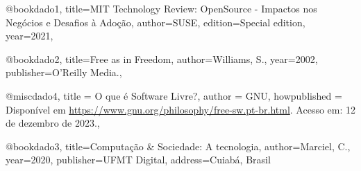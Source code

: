 @book{dado1,
  title={MIT Technology Review: OpenSource - Impactos nos Negócios e Desafios à Adoção},
  author={SUSE},
  edition={Special edition},
  year={2021},
}

@book{dado2,
  title={Free as in Freedom},
  author={Williams, S.},
  year={2002},
  publisher={O'Reilly Media.},
}


@misc{dado4,
  title = {O que é Software Livre?},
  author = {GNU},
  howpublished = {Disponível em \url{https://www.gnu.org/philosophy/free-sw.pt-br.html}. Acesso em: 12 de dezembro de 2023.},
}

@book{dado3,
  title={Computação & Sociedade: A tecnologia},
  author={Marciel, C.},
  year={2020},
  publisher={UFMT Digital},
  address={Cuiabá, Brasil}
}





